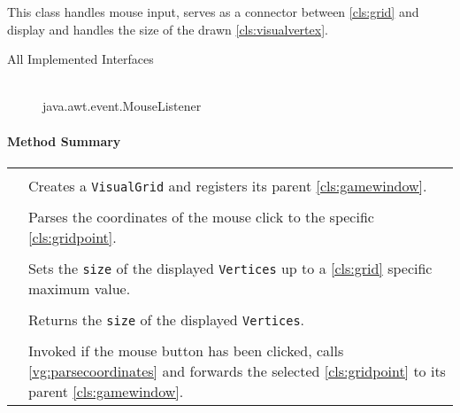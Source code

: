 This class handles mouse input, serves as a connector between \ref{cls:grid} and display and handles the size of the drawn \ref{cls:visualvertex}. \\ 
\begin{description}
	\item[All Implemented Interfaces] \hfill \\
	java.awt.event.MouseListener
\end{description}
\centerdash

\paragraph*{Method Summary}
\paragraph*{}
\begin{longtable}{Lp{10cm}}
	\startmethodtable
	 \\
	& Creates a \texttt{VisualGrid} and registers its parent \ref{cls:gamewindow}. \\
	 \\
	& Parses the coordinates of the mouse click to the specific \ref{cls:gridpoint}. \\
	 \\
	& Sets the \texttt{size} of the displayed \texttt{Vertices} up to a \ref{cls:grid} specific maximum value. \\
	 \\
	& Returns the \texttt{size} of the displayed \texttt{Vertices}. \\ 
	 \\
	& Invoked if the mouse button has been clicked, calls \ref{vg:parsecoordinates} and forwards the selected \ref{cls:gridpoint} to its parent \ref{cls:gamewindow}. \\ 
	\hline
\end{longtable}
\pagebreak


